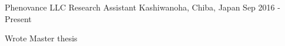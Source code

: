 \vspace*{0.35cm}

\begin{cventries}

  \cventry
    {Phenovance LLC}
    {Research Assistant}
    {Kashiwanoha, Chiba, Japan}
    {Sep 2016 - Present}
    {
        \begin{cvitems}
            \item{Wrote Master thesis}
        \end{cvitems}
    }
    \vspace*{0.2cm}

\end{cventries}
